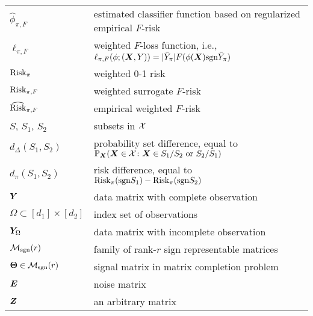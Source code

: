 \documentclass[11pt]{article}
\theoremstyle{plain}
\theoremstyle{definition}
\def\caliM{\tM_{\textup{sgn}}}
\def\sign{\textup{sgn}}
\def\risk{\textup{Risk}_\pi}
\def\caliM{\tM_{\textup{sgn}}}
\def\riskF{\textup{Risk}_{\pi,F}}
\def\eriskF{\widehat{\textup{Risk}}_{\pi,F}}
\begin{document}
\begin{table}[ht]
\begin{tabular}{l|l}
$\hat \phi_{\pi,F}$ & estimated classifier function based on regularized empirical $F$-risk\\
$\ell_{\pi,F}$ & weighted $F$-loss function, i.e., $\ell_{\pi,F}(\phi;(\mX,Y)) = |\bar{Y}_\pi|F(\phi(\mX)\sign\bar{Y}_\pi)$\\
$\risk$ & weighted 0-1 risk \\
$\riskF$ & weighted surrogate $F$-risk\\
$\eriskF$ & empirical weighted  $F$-risk\\
$S$, $S_1$, $S_2$ & subsets in $\mathcal{X}$\\
$d_{\Delta}(S_1,S_2)$&probability set difference, equal to $\mathbb{P}_{\bm X}(\bm X\in\mathcal{X}\colon \bm X\in S_1/S_2 \text{ or }S_2/S_1)$\\
$d_{\pi}(S_1,S_2)$& risk difference, equal to $\risk(\sign S_1)-\risk(\sign S_2)$\\
$\bm Y$ & data matrix with complete observation\\
$\Omega\subset[d_1]\times[d_2]$ & index set of observations\\
$\bm Y_{\Omega}$ & data matrix with incomplete observation\\
$\caliM(r)$ & family of rank-$r$ sign representable matrices\\
$\mTheta\in\caliM(r)$ & signal matrix in matrix completion problem\\
$\bm{E}$ & noise matrix\\
$\bm Z$ & an arbitrary matrix\\
\end{tabular}
\end{table}
\clearpage
\end{document}
